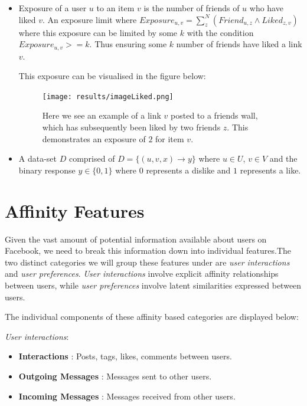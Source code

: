 \begin{itemize}
\item  Exposure of a user $u$
to an item $v$ is the number of friends of $u$ who have liked $v$. An exposure limit where $Exposure_{u,v} = \displaystyle\sum_{z}^{N} (Friend_{u,z} \wedge Liked_{z,v})$ where this exposure can be 
limited by some $k$ with the condition $Exposure_{u,v} >= k$. Thus ensuring some $k$ number of friends have liked a link $v$.

This exposure can be visualised in the figure below:

\begin{figure}[h!]
	\begin{center}
		\texttt{[image: results/imageLiked.png]}
		\caption{Here we see an example of a link $v$ posted to a friends wall, which has subsequently been liked by two friends $z$. This 
				 demonstrates an exposure of $2$ for item $v$.}
	\end{center}
\end{figure}

\item A data-set $D$ comprised of $D = \{(u,v,x) \to y\}$ where $u \in U$, $v \in V$ and the binary response $y \in \{0,1\}$ 
where $0$ represents a dislike and $1$ represents a like. 
\end{itemize}

\section{Affinity Features}
\label{sec:features}

Given the vast amount of potential information available about users on Facebook, we need to break this information down into individual 
features.The two distinct categories we will group these features under are \emph{user interactions} and \emph{user preferences}. 
\emph{User interactions} involve explicit affinity relationships between users, while \emph{user preferences} involve latent 
similarities expressed between users.

The individual components of these affinity based categories are displayed below:

\emph{User interactions}:
\begin{itemize}
\item \textbf{Interactions} : Posts, tags, likes, comments between users.
\item \textbf{Outgoing Messages} : Messages sent to other users.
\item \textbf{Incoming Messages} : Messages received from other users.
\end{itemize}

